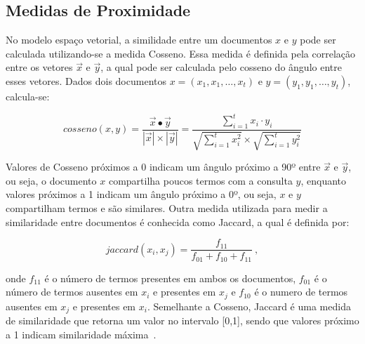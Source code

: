 
\subsection{Medidas de Proximidade}
\label{subsec:MedidasProximidade}
No modelo espaço vetorial, a similidade entre um documentos $x$ e $y$ pode ser calculada utilizando-se a medida Cosseno. Essa medida é definida pela correlação entre os vetores $\vec{x}$ e $\vec{y}$, a qual pode ser calculada pelo cosseno do  ângulo entre esses vetores. Dados dois documentos $x = (x_1, x_1, \dots, x_t)$ e $y = (y_1, y_1, \dots, y_t)$, calcula-se: 




\begin{equation}
cosseno(x, y) = \frac{ \vec{x} \bullet \vec{y} }
                   { |\vec{x}| \times | \vec{y}|}
            = \frac{ \sum_{i=1}^{t} x_i \cdot y_i}
                   { \sqrt{\sum_{i=1}^{t} x_i^2} \times \sqrt{\sum_{i=1}^{t} y_i^2 } }                      \label{equ:cosine}
\end{equation} 


Valores de Cosseno próximos a 0 indicam um ângulo próximo a 90º entre $\vec{x}$ e $\vec{y}$, ou seja, o documento $x$ compartilha poucos termos com a consulta $y$, enquanto valores próximos a 1 indicam um ângulo próximo a 0º, ou seja, $x$ e $y$ compartilham termos e são similares.
%
Outra medida utilizada para medir a similaridade entre documentos é conhecida como Jaccard, a qual é definida por:

\begin{equation}
jaccard(x_i, x_j) = \frac{f_{11}}{f_{01} + f_{10} + f_{11}}~,
\end{equation}

\noindent
onde 
$f_{11}$ é o número de termos presentes em ambos os documentos,
$f_{01}$ é o número de termos ausentes em $x_i$ e presentes em $x_j$ e
$f_{10}$ é o numero de termos ausentes em $x_j$ e presentes em $x_i$.
%
Semelhante a Cosseno, Jaccard é uma medida de similaridade que retorna um valor no intervalo [0,1], sendo que valores próximo a 1 indicam similaridade máxima~\cite{Maracini2010,Tan2005,Feldman2006}.
